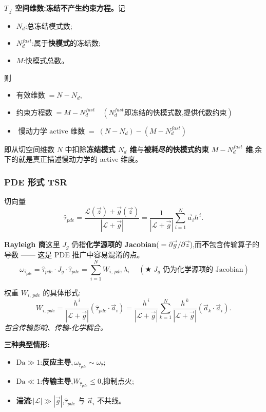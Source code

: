\documentclass[11pt,a4paper]{article}
\newcommand{\Jg}{J_{\!g}}
\begin{document}
\medskip
\noindent\textbf{$T_{\vec z}$ 空间维数:冻结不产生约束方程。}\quad 记
\begin{itemize}[leftmargin=2em]
\item $N_d$:总冻结模式数;
\item $N_d^{fast}$:属于\textbf{快模式}的冻结数;
\item $M$:快模式总数。
\end{itemize}
则
\begin{itemize}
\item $\text{有效维数}\;=N-N_d$,
\item $\text{约束方程数}\;=M-N_d^{fast}\quad(N_d^{fast}\text{即冻结的快模式数,提供代数约束})$
\item $\boxed{\;\text{慢动力学 active 维数}\;=\;(N-N_d)-(M-N_d^{fast})\;}$
\end{itemize}
即从切空间维数 $N$ 中扣除\textbf{冻结模式 $N_d$ 维}与\textbf{被耗尽的快模式约束 $M-N_d^{fast}$ 维},余下的就是真正描述慢动力学的 active 维度。

\subsubsection*{PDE 形式 TSR}
切向量
\begin{equation}
\hat\tau_{pde}=\frac{\mathcal L(\vec z)+\vec g(\vec z)}{|\mathcal L+\vec g|}=\frac{1}{|\mathcal L+\vec g|}\sum_{i=1}^{N}\vec a_i h^{\,i}.
\end{equation}

\noindent\textbf{Rayleigh 商}\quad 这里 $\Jg$ 仍指\textbf{化学源项的 Jacobian}($=\partial\vec g/\partial\vec z$),而\textbf{不}包含传输算子的导数 —— 这是 PDE 推广中容易混淆的点。
\begin{equation}
\boxed{\;\omega_{\hat\tau_{pde}}=\hat\tau_{pde}\cdot\Jg\cdot\hat\tau_{pde}=\sum_{i=1}^{N}W_{i,\,pde}\,\lambda_i\;}\quad(\bigstar\;\Jg\text{ 仍为化学源项的 Jacobian})
\end{equation}

\noindent 权重 $W_{i,\,pde}$ 的具体形式:
\begin{equation}
W_{i,\,pde}=\frac{h^{\,i}}{|\mathcal L+\vec g|}(\hat\tau_{pde}\cdot\vec a_i)
=\frac{h^{\,i}}{|\mathcal L+\vec g|}\sum_{k=1}^{N}\frac{h^{\,k}}{|\mathcal L+\vec g|}(\vec a_k\cdot\vec a_i).
\end{equation}
\emph{包含传输影响、传输-化学耦合。}

\medskip
\noindent\textbf{三种典型情形:}
\begin{itemize}[leftmargin=2em]
    \item $\mathrm{Da}\gg 1$:\textbf{反应主导},$\,$$\omega_{\hat\tau_{pde}}\sim \omega_{\hat\tau}$;
    \item $\mathrm{Da}\ll 1$:\textbf{传输主导},$W_{\hat\tau_{pde}}\leq 0$,抑制点火;
    \item \textbf{湍流}:$|\mathcal L|\gg|\vec g|$,$\hat\tau_{pde}$ 与 $\vec a_i$ 不共线。
\end{itemize}
\end{document}

